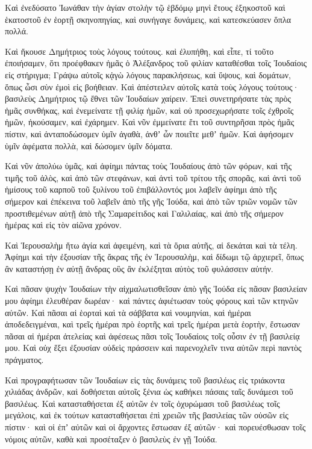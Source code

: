 {Καὶ ἐνεδύσατο Ἰωνάθαν τὴν ἁγίαν στολὴν τῷ ἑβδόμῳ μηνὶ ἔτους ἑξηκοστοῦ καὶ ἑκατοστοῦ ἐν ἑορτῇ σκηνοπηγίας, καὶ συνήγαγε δυνάμεις, καὶ κατεσκεύασεν ὅπλα πολλά.
\par }{\PP {}Καὶ ἤκουσε Δημήτριος τοὺς λόγους τούτους. καὶ ἐλυπήθη, καὶ εἶπε,
τί τοῦτο ἐποιήσαμεν, ὅτι προέφθακεν ἡμᾶς ὁ Ἀλέξανδρος τοῦ φιλίαν καταθέσθαι τοῖς Ἰουδαίοις εἰς στήριγμα;
Γράψω αὐτοῖς κᾀγὼ λόγους παρακλήσεως, καὶ ὕψους, καὶ δομάτων, ὅπως ὦσι σὺν ἐμοὶ εἰς βοήθειαν.
Καὶ ἀπέστειλεν αὐτοῖς κατὰ τοὺς λόγους τούτους· βασιλεὺς Δημήτριος τῷ ἔθνει τῶν Ἰουδαίων χαίρειν.
Ἐπεὶ συνετηρήσατε τὰς πρὸς ἡμᾶς συνθήκας, καὶ ἐνεμείνατε τῇ φιλίᾳ ἡμῶν, καὶ οὐ προσεχωρήσατε τοῖς ἐχθροῖς ἡμῶν, ἠκούσαμεν, καὶ ἐχάρημεν.
Καὶ νῦν ἐμμείνατε ἔτι τοῦ συντηρῆσαι πρὸς ἡμᾶς πίστιν, καὶ ἀνταποδώσομεν ὑμῖν ἀγαθὰ, ἀνθʼ ὧν ποιεῖτε μεθʼ ἡμῶν.
Καὶ ἀφήσομεν ὑμῖν ἀφέματα πολλὰ, καὶ δώσομεν ὑμῖν δόματα.
\par }{\PP {}Καὶ νῦν ἀπολύω ὑμᾶς, καὶ ἀφίημι πάντας τοὺς Ἰουδαίους ἀπὸ τῶν φόρων, καὶ τῆς τιμῆς τοῦ ἁλὸς, καὶ ἀπὸ τῶν στεφάνων,
καὶ ἀντὶ τοῦ τρίτου τῆς σπορᾶς, καὶ ἀντὶ τοῦ ἡμίσους τοῦ καρποῦ τοῦ ξυλίνου τοῦ ἐπιβάλλοντός μοι λαβεῖν ἀφίημι ἀπὸ τῆς σήμερον καὶ ἐπέκεινα τοῦ λαβεῖν ἀπὸ τῆς γῆς Ἰούδα, καὶ ἀπὸ τῶν τριῶν νομῶν τῶν προστιθεμένων αὐτῇ ἀπὸ τῆς Σαμαρείτιδος καὶ Γαλιλαίας, καὶ ἀπὸ τῆς σήμερον ἡμέρας καὶ εἰς τὸν αἰῶνα χρόνον.
\par }{\PP {}Καὶ Ἱερουσαλὴμ ἤτω ἁγία καὶ ἀφειμένη, καὶ τὰ ὅρια αὐτῆς, αἱ δεκάται καὶ τὰ τέλη.
Ἀφίημι καὶ τὴν ἐξουσίαν τῆς ἄκρας τῆς ἐν Ἱερουσαλὴμ, καὶ δίδωμι τῷ ἀρχιερεῖ, ὅπως ἂν καταστήσῃ ἐν αὐτῇ ἄνδρας οὓς ἂν ἐκλέξηται αὐτὸς τοῦ φυλάσσειν αὐτήν.
\par }{\PP {}Καὶ πᾶσαν ψυχὴν Ἰουδαίων τὴν αἰχμαλωτισθεῖσαν ἀπὸ γῆς Ἰούδα εἰς πᾶσαν βασιλείαν μου ἀφίημι ἐλευθέραν δωρέαν· καὶ πάντες ἀφιέτωσαν τοὺς φόρους καὶ τῶν κτηνῶν αὐτῶν.
Καὶ πᾶσαι αἱ ἑορταὶ καὶ τὰ σάββατα καὶ νουμηνίαι, καὶ ἡμέραι ἀποδεδειγμέναι, καὶ τρεῖς ἡμέραι πρὸ ἑορτῆς καὶ τρεῖς ἡμέραι μετὰ ἑορτὴν, ἔστωσαν πᾶσαι αἱ ἡμέραι ἀτελείας καὶ ἀφέσεως πᾶσι τοῖς Ἰουδαίοις τοῖς οὖσιν ἐν τῇ βασιλείᾳ μου.
Καὶ οὐχ ἕξει ἐξουσίαν οὐδεὶς πράσσειν καὶ παρενοχλεῖν τινα αὐτῶν περὶ παντὸς πράγματος.
\par }{\PP {}Καὶ προγραφήτωσαν τῶν Ἰουδαίων εἰς τὰς δυνάμεις τοῦ βασιλέως εἰς τριάκοντα χιλιάδας ἀνδρῶν, καὶ δοθήσεται αὐτοῖς ξένια ὡς καθήκει πάσαις ταῖς δυνάμεσι τοῦ βασιλέως.
Καὶ κατασταθήσεται ἐξ αὐτῶν ἐν τοῖς ὀχυρώμασι τοῦ βασιλέως τοῖς μεγάλοις, καὶ ἐκ τούτων κατασταθήσεται ἐπὶ χρειῶν τῆς βασιλείας τῶν οὐσῶν εἰς πίστιν· καὶ οἱ ἐπʼ αὐτῶν καὶ οἱ ἄρχοντες ἔστωσαν ἐξ αὐτῶν· καὶ πορευέσθωσαν τοῖς νόμοις αὐτῶν, καθὰ καὶ προσέταξεν ὁ βασιλεὺς ἐν γῇ Ἰούδα.
}
